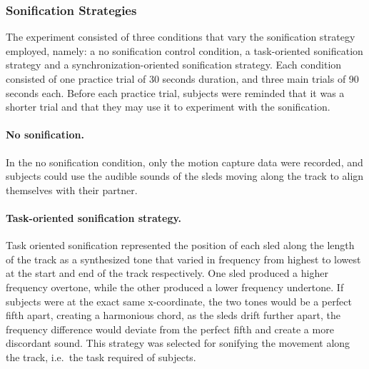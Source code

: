 \documentclass[10pt,a4paper,onecolumn]{article}
\let\oldparagraph\paragraph
\renewcommand{\paragraph}[1]{\oldparagraph{#1}\mbox{}}
\begin{document}
\hypertarget{sonification-strategies}{%
\subsubsection{Sonification Strategies}\label{sonification-strategies}}

The experiment consisted of three conditions that vary the sonification strategy employed, namely: a no sonification control condition, a task-oriented sonification strategy and a synchronization-oriented sonification strategy. Each condition consisted of one practice trial of 30 seconds duration, and three main trials of 90 seconds each. Before each practice trial, subjects were reminded that it was a shorter trial and that they may use it to experiment with the sonification.

\hypertarget{no-sonification.}{%
\paragraph{No sonification.}\label{no-sonification.}}

In the no sonification condition, only the motion capture data were recorded, and subjects could use the audible sounds of the sleds moving along the track to align themselves with their partner.

\hypertarget{task-oriented-sonification-strategy.}{%
\paragraph{Task-oriented sonification strategy.}\label{task-oriented-sonification-strategy.}}

Task oriented sonification represented the position of each sled along the length of the track as a synthesized tone that varied in frequency from highest to lowest at the start and end of the track respectively. One sled produced a higher frequency overtone, while the other produced a lower frequency undertone. If subjects were at the exact same x-coordinate, the two tones would be a perfect fifth apart, creating a harmonious chord, as the sleds drift further apart, the frequency difference would deviate from the perfect fifth and create a more discordant sound. This strategy was selected for sonifying the movement along the track, i.e.~the task required of subjects.
\end{document}
